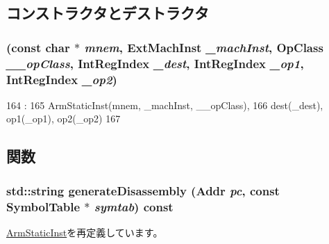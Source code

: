 \subsection{コンストラクタとデストラクタ}
\hypertarget{classArmISA_1_1DataX2RegOp_a8175685987c62cc668a8b0537e4fd02d}{
\subsubsection[{DataX2RegOp}]{ (const char $\ast$ {\em mnem}, \/  {\bf ExtMachInst} {\em \_\-machInst}, \/  OpClass {\em \_\-\_\-opClass}, \/  {\bf IntRegIndex} {\em \_\-dest}, \/  {\bf IntRegIndex} {\em \_\-op1}, \/  {\bf IntRegIndex} {\em \_\-op2})}}
\label{classArmISA_1_1DataX2RegOp_a8175685987c62cc668a8b0537e4fd02d}



\begin{DoxyCode}
164                                                                        :
165         ArmStaticInst(mnem, _machInst, __opClass),
166         dest(_dest), op1(_op1), op2(_op2)
167     {}

\end{DoxyCode}


\subsection{関数}
\hypertarget{classArmISA_1_1DataX2RegOp_a95d323a22a5f07e14d6b4c9385a91896}{
\subsubsection[{generateDisassembly}]{\setlength{\rightskip}{0pt plus 5cm}std::string generateDisassembly ({\bf Addr} {\em pc}, \/  const SymbolTable $\ast$ {\em symtab}) const}}
\label{classArmISA_1_1DataX2RegOp_a95d323a22a5f07e14d6b4c9385a91896}


\hyperlink{classArmISA_1_1ArmStaticInst_a95d323a22a5f07e14d6b4c9385a91896}{ArmStaticInst}を再定義しています。


